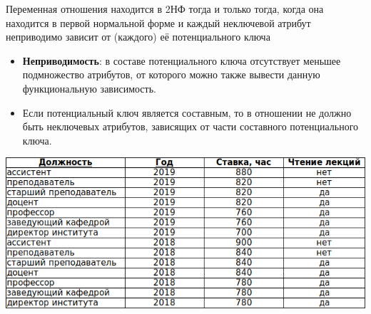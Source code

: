\documentclass{beamer}
\begin{document}
\begin{frame}
\begin{block}{Переменная отношения находится в 2НФ}
тогда и только тогда, когда она находится в первой нормальной форме и каждый неключевой атрибут неприводимо зависит от (каждого) её потенциального ключа
\end{block}
\begin{itemize}
\item \textbf{Неприводимость}: в составе потенциального ключа отсутствует меньшее подмножество атрибутов, от которого можно также вывести данную функциональную зависимость.
\item Если потенциальный ключ является составным, то в отношении не должно быть неключевых атрибутов, зависящих от части составного потенциального ключа. 
\end{itemize}
\begin{center}
\includegraphics[scale=1.4]{images/ex-rasp-07.png}
\end{center}
\end{frame}
\end{document}
